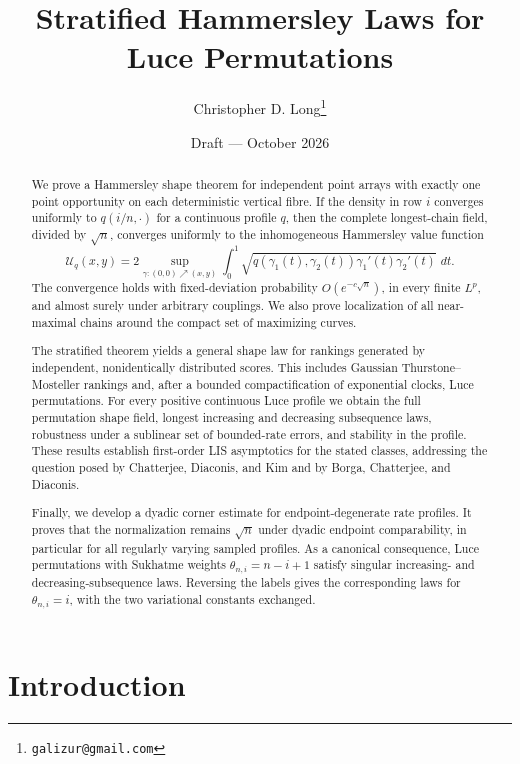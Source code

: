 \documentclass[11pt]{article}
\title{Stratified Hammersley Laws for Luce Permutations}
\author{Christopher D. Long\thanks{\texttt{galizur@gmail.com}}}
\date{Draft --- October 2026}
\theoremstyle{remark}
\newcommand{\dd}{\,d}
\newcommand{\calU}{\mathcal U}
\begin{document}
\maketitle

\begin{abstract}
We prove a Hammersley shape theorem for independent point arrays with exactly
one point opportunity on each deterministic vertical fibre.  If the density
in row $i$ converges uniformly to $q(i/n,\cdot)$ for a continuous profile
$q$, then the complete
longest-chain field, divided by $\sqrt n$, converges uniformly to the
inhomogeneous Hammersley value function
\[
  \calU_q(x,y)
  =2\sup_{\gamma:(0,0)\nearrow(x,y)}
  \int_0^1\sqrt{q(\gamma_1(t),\gamma_2(t))
  \gamma_1'(t)\gamma_2'(t)}\,\dd t.
\]
The convergence holds with fixed-deviation probability
$O(e^{-c\sqrt n})$, in every finite $L^p$, and almost surely under arbitrary
couplings.  We also prove localization of all near-maximal chains around the
compact set of maximizing curves.

The stratified theorem yields a general shape law for rankings generated by
independent, nonidentically distributed scores.  This includes Gaussian
Thurstone--Mosteller rankings and, after a bounded compactification of
exponential clocks, Luce permutations.  For every positive continuous Luce
profile we obtain the full permutation shape field, longest increasing and
decreasing subsequence laws, robustness under a sublinear set of bounded-rate
errors, and stability in the profile.  These results establish first-order
LIS asymptotics for the stated classes, addressing the question posed by
Chatterjee, Diaconis, and Kim and by Borga, Chatterjee, and Diaconis.

Finally, we develop a dyadic corner estimate for endpoint-degenerate rate
profiles.  It proves that the normalization remains $\sqrt n$ under dyadic
endpoint comparability, in particular for all regularly varying sampled
profiles.  As a canonical consequence, Luce permutations with Sukhatme
weights $\theta_{n,i}=n-i+1$ satisfy singular increasing- and
decreasing-subsequence laws.  Reversing the labels gives the corresponding
laws for $\theta_{n,i}=i$, with the two variational constants exchanged.
\end{abstract}

\tableofcontents

\section{Introduction}
\end{document}
